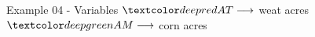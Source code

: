 \begin{frame}{Example 04 - Variables}
\Huge{
$\colora{AT} \longrightarrow$
    weat acres \\ \vspace{1cm}
$\colorb{AM} \longrightarrow$
    corn acres
}
\end{frame}
